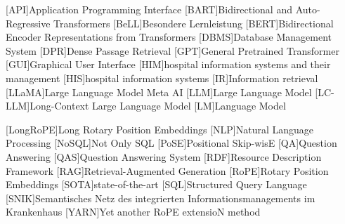 \begin{acronym}[SPARQL]
[API]{Application Programming Interface}
[BART]{Bidirectional and Auto-Regressive Transformers}
[BeLL]{Besondere Lernleistung}
[BERT]{Bidirectional Encoder Representations from Transformers}
[DBMS]{Database Management System}
[DPR]{Dense Passage Retrieval}
[GPT]{General Pretrained Transformer}
[GUI]{Graphical User Interface}
[HIM]{hospital information systems and their management}
[HIS]{hospital information systems}
[IR]{Information retrieval}
[LLaMA]{Large Language Model Meta AI}
[LLM]{Large Language Model}
[LC-LLM]{Long-Context Large Language Model}
[LM]{Language Model}

[LongRoPE]{Long Rotary Position Embeddings}
[NLP]{Natural Language Processing}
[NoSQL]{Not Only SQL}
[PoSE]{Positional Skip-wisE}
[QA]{Question Answering}
[QAS]{Question Answering System}
[RDF]{Resource Description Framework}
[RAG]{Retrieval-Augmented Generation}
[RoPE]{Rotary Position Embeddings}
[SOTA]{state-of-the-art}
[SQL]{Structured Query Language}
[SNIK]{Semantisches Netz des integrierten Informationsmanagements im Krankenhaus}
[YARN]{Yet another RoPE extensioN method}
\end{acronym}

